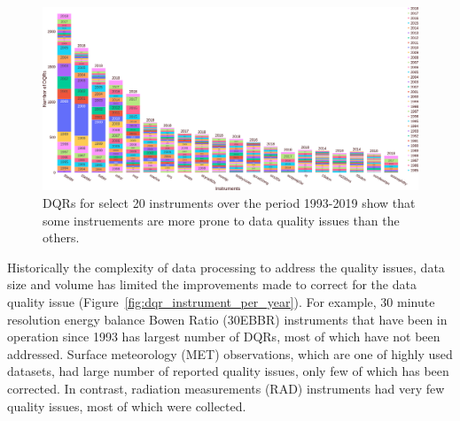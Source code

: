 \begin{figure}
 \includegraphics[width=\linewidth]{figures/dqr_by_instrument_20.png}
 \caption{DQRs for select 20 instruments over the period 1993-2019 show
	 that some instruements are more prone to data quality issues than
		 the others.}
 \label{fig:dqr_by_instrument}
\end{figure}

Historically the complexity of data processing to address the quality
issues, data size and volume has limited the improvements made to
correct for the data quality issue
(Figure~\ref{fig:dqr_instrument_per_year}). For example, 30 minute
resolution energy balance Bowen Ratio (30EBBR)
instruments that have been in operation since 1993 has largest number of
DQRs, most of which have not been addressed. Surface meteorology (MET)
observations, which are one of highly used datasets, had large number of
reported quality issues, only few of which has been corrected. In
contrast, radiation measurements (RAD) instruments had very few quality
issues, most of which were collected. 

